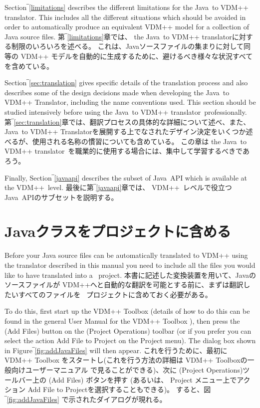 \documentclass[\pformat,12pt]{jarticle}
\newcommand{\ToolboxName}{VDM++ Toolbox}
\newcommand{\JAVA}{Java}
\newcommand{\tjTov}{the \JAVA\ to VDM++ translator}
\newcommand{\VDM}{VDM++}
\newcommand{\jTov}{\JAVA\ to VDM++ Translator}
\newcommand{\guicmd}[1]{{\sf #1}}
\begin{document}
Section‾\ref{limitations} describes the different limitations for \tjTov{}.
This includes all the different situations which should be
avoided in order to automatically produce an equivalent VDM++ model
for a collection of Java source files.
第‾\ref{limitations}章では、 \tjTov{}に対する制限のいろいろを述べる。
これは、Javaソースファイルの集まりに対して同等の VDM++ モデルを自動的に生成するために、避けるべき様々な状況すべてを含めている。

Section‾\ref{sec:translation}  gives specific details of the
translation process and also describes some of the design decisions
made when developing the \jTov{}, including the name conventions
used. This section should be studied intensively before using \tjTov\ 
professionally.
第‾\ref{sec:translation}章では、翻訳プロセスの具体的な詳細について述べ、また、 \jTov{}を展開する上でなされたデザイン決定をいくつか述べるが、使用される名称の慣習についても含めている。
この章は \tjTov\ を職業的に使用する場合には、集中して学習するべきであろう。

Finally, Section‾\ref{javaapi} describes the subset of \JAVA\ API
which is available at the \VDM\ level. 
最後に第‾\ref{javaapi}章では、 \VDM\ レベルで役立つ \JAVA\ APIのサブセットを説明する。
\section{Javaクラスをプロジェクトに含める}

Before your Java source files can be automatically translated to VDM++
using the translator described in this manual you need to include all
the files you would like to have translated into a \VDMTools\
project. 
本書に記述した変換装置を用いて、Javaのソースファイルが VDM++へと自動的な翻訳を可能とする前に、まずは翻訳したいすべてのファイルを \VDMTools\ プロジェクトに含めておく必要がある。

To do this, first start up the \ToolboxName{} (details of how to do
this can be found in the general User Manual for the VDM++
Toolbox \cite{UserManPP-CSK}), then press the 
(\guicmd{Add Files}) button on the (\guicmd{Project Operations})
toolbar (or if you prefer you can select the action \guicmd{Add File
  to Project} on the \guicmd{Project} menu). The dialog box shown
in Figure‾\ref{fig:addJavaFiles} will then appear. 
これを行うために、最初に \ToolboxName{} をスタートし(これを行う方法の詳細は VDM++ Toolboxの一般向けユーザーマニュアル \cite{UserManPP-CSK}で見ることができる)、次に (\guicmd{Project Operations})ツールバー上の  (\guicmd{Add Files}) ボタンを押す (あるいは、 \guicmd{Project} メニュー上でアクション \guicmd{Add File to Project}を選択することもできる)。 
すると、図‾\ref{fig:addJavaFiles} で示されたダイアログが現れる。
\end{document}

